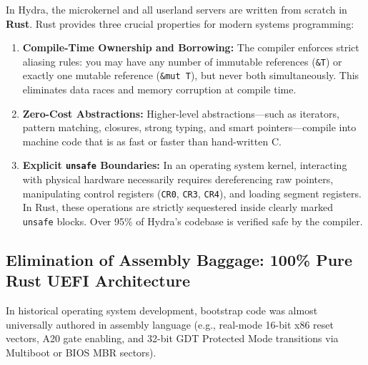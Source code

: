 In Hydra, the microkernel and all userland servers are written from scratch in \textbf{Rust}. Rust provides three crucial properties for modern systems programming:
\begin{enumerate}
    \item \textbf{Compile-Time Ownership and Borrowing:} The compiler enforces strict aliasing rules: you may have any number of immutable references (\texttt{\&T}) or exactly one mutable reference (\texttt{\&mut T}), but never both simultaneously. This eliminates data races and memory corruption at compile time.
    \item \textbf{Zero-Cost Abstractions:} Higher-level abstractions---such as iterators, pattern matching, closures, strong typing, and smart pointers---compile into machine code that is as fast or faster than hand-written C.
    \item \textbf{Explicit \texttt{unsafe} Boundaries:} In an operating system kernel, interacting with physical hardware necessarily requires dereferencing raw pointers, manipulating control registers (\texttt{CR0}, \texttt{CR3}, \texttt{CR4}), and loading segment registers. In Rust, these operations are strictly sequestered inside clearly marked \texttt{unsafe} blocks. Over 95\% of Hydra's codebase is verified safe by the compiler.
\end{enumerate}

\subsection{Elimination of Assembly Baggage: 100\% Pure Rust UEFI Architecture}
In historical operating system development, bootstrap code was almost universally authored in assembly language (e.g., real-mode 16-bit x86 reset vectors, A20 gate enabling, and 32-bit GDT Protected Mode transitions via Multiboot or BIOS MBR sectors). 

